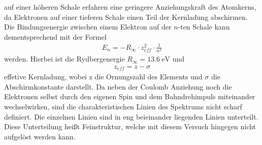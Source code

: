 \justifying auf einer höheren Schale erfahren eine geringere Anziehungskraft des Atomkerns, da Elektronen auf einer tieferen
Schale einen Teil der Kernladung abschirmen. Die Bindungsenergie zwischen einem Elektron auf der $n$-ten Schale kann dementsprechend mit der 
Formel \cite{V602}
\begin{align}
    E_n = -R_{\infty}\cdot z_{eff}^2 \cdot \frac{1}{n^2} \label{eq:1}
\end{align}
\justifying werden. Hierbei ist die Rydbergenergie $R_{\infty}=\SI{13.6}{\electronvolt}$ und 
\begin{align}
    z_{eff}=z-\sigma \label{eq:2}
\end{align}
\justifying effetive Kernladung, wobei z die Ornungszahl des Elements und $\sigma$ die Abschirmkonstante darstellt. 
Da neben der Coulomb Anziehung noch die Elektronen selbst durch den eigenen Spin und dem Bahndrehimpuls miteinander wechselwirken, sind die
charakteristischen Linien des Spektrums nicht scharf definiert. Die einzelnen Linien sind in eng beieinander liegenden Linien unterteilt. Diese 
Unterteilung heißt Feinstruktur, welche mit diesem Versuch hingegen nicht aufgelöst werden kann. 

